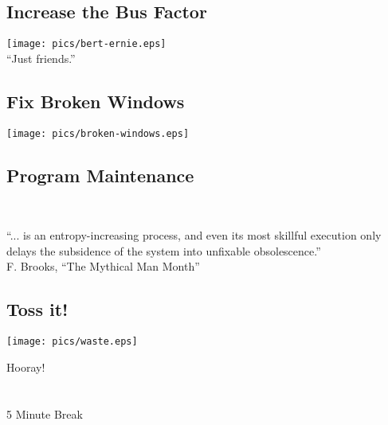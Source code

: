 \documentclass[xga]{xdvislides}
\begin{document}
\subsection{Increase the Bus Factor}
\vspace*{\fill}
\begin{center}
	\texttt{[image: pics/bert-ernie.eps]} \\
	\small
	``Just friends.''
\end{center}
\vspace*{\fill}

\subsection{Fix Broken Windows}
\vspace*{\fill}
\begin{center}
	\texttt{[image: pics/broken-windows.eps]}
\end{center}
\vspace*{\fill}

\subsection{Program Maintenance}
\\
\Huge
\begin{center}
	``... is an entropy-increasing process, and even its most skillful
	execution only delays the subsidence of the system into unfixable
	obsolescence.'' \\
	\addvspace{.2in}
	\small F. Brooks, ``The Mythical Man Month''
\end{center}
\Normalsize

\subsection{Toss it!}
\vspace*{\fill}
\begin{center}
	\texttt{[image: pics/waste.eps]}
\end{center}
\vspace*{\fill}

\newpage
\vspace*{\fill}
\begin{center}
    \Hugesize
        Hooray! \\ [1em]
    \hspace*{5mm}
    \blueline\\
    \hspace*{5mm}\\
        5 Minute Break
\end{center}
\vspace*{\fill}
\end{document}
